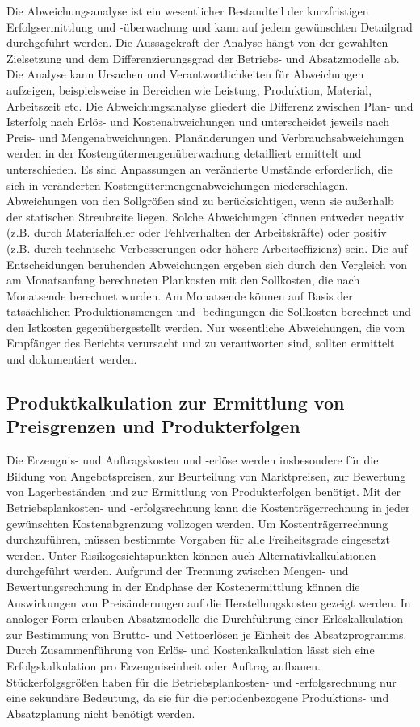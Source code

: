 Die Abweichungsanalyse ist ein wesentlicher Bestandteil der kurzfristigen Erfolgsermittlung und -überwachung und kann auf jedem gewünschten Detailgrad durchgeführt werden. Die Aussagekraft der Analyse hängt von der gewählten Zielsetzung und dem Differenzierungsgrad der Betriebs- und Absatzmodelle ab. Die Analyse kann Ursachen und Verantwortlichkeiten für Abweichungen aufzeigen, beispielsweise in Bereichen wie Leistung, Produktion, Material, Arbeitszeit etc. Die Abweichungsanalyse gliedert die Differenz zwischen Plan- und Isterfolg nach Erlös- und Kostenabweichungen und unterscheidet jeweils nach Preis- und Mengenabweichungen. Planänderungen und Verbrauchsabweichungen werden in der Kostengütermengenüberwachung detailliert ermittelt und unterschieden. Es sind Anpassungen an veränderte Umstände erforderlich, die sich in veränderten Kostengütermengenabweichungen niederschlagen. Abweichungen von den Sollgrö{\ss}en sind zu berücksichtigen, wenn sie au{\ss}erhalb der statischen Streubreite liegen. Solche Abweichungen können entweder negativ (z.B. durch Materialfehler oder Fehlverhalten der Arbeitskräfte) oder positiv (z.B. durch technische Verbesserungen oder höhere Arbeitseffizienz) sein. Die auf Entscheidungen beruhenden Abweichungen ergeben sich durch den Vergleich von am Monatsanfang berechneten Plankosten mit den Sollkosten, die nach Monatsende berechnet wurden. Am Monatsende können auf Basis der tatsächlichen Produktionsmengen und -bedingungen die Sollkosten berechnet und den Istkosten gegenübergestellt werden. Nur wesentliche Abweichungen, die vom Empfänger des Berichts verursacht und zu verantworten sind, sollten ermittelt und dokumentiert werden.

\subsection{Produktkalkulation zur Ermittlung von Preisgrenzen und Produkterfolgen}

Die Erzeugnis- und Auftragskosten und -erlöse werden insbesondere für die Bildung von Angebotspreisen, zur Beurteilung von Marktpreisen, zur Bewertung von Lagerbeständen und zur Ermittlung von Produkterfolgen benötigt. Mit der Betriebsplankosten- und -erfolgsrechnung kann die Kostenträgerrechnung in jeder gewünschten Kostenabgrenzung vollzogen werden. Um Kostenträgerrechnung durchzuführen, müssen bestimmte Vorgaben für alle Freiheitsgrade eingesetzt werden. Unter Risikogesichtspunkten können auch Alternativkalkulationen durchgeführt werden. Aufgrund der Trennung zwischen Mengen- und Bewertungsrechnung in der Endphase der Kostenermittlung können die Auswirkungen von Preisänderungen auf die Herstellungskosten gezeigt werden. In analoger Form erlauben Absatzmodelle die Durchführung einer Erlöskalkulation zur Bestimmung von Brutto- und Nettoerlösen je Einheit des Absatzprogramms. Durch Zusammenführung von Erlös- und Kostenkalkulation lässt sich eine Erfolgskalkulation pro Erzeugniseinheit oder Auftrag aufbauen. Stückerfolgsgrö{\ss}en haben für die Betriebsplankosten- und -erfolgsrechnung nur eine sekundäre Bedeutung, da sie für die periodenbezogene Produktions- und Absatzplanung nicht benötigt werden.

